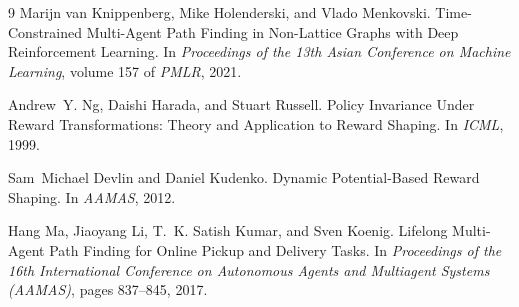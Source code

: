 \documentclass[11pt]{article}
\begin{document}
\begin{thebibliography}{9}
Marijn van Knippenberg, Mike Holenderski, and Vlado Menkovski.
\newblock Time-Constrained Multi-Agent Path Finding in Non-Lattice Graphs
  with Deep Reinforcement Learning.
\newblock In \emph{Proceedings of the 13th Asian Conference on Machine
  Learning}, volume 157 of \emph{PMLR}, 2021.

Andrew~Y. Ng, Daishi Harada, and Stuart Russell.
\newblock Policy Invariance Under Reward Transformations: Theory and
  Application to Reward Shaping.
\newblock In \emph{ICML}, 1999.

Sam~Michael Devlin and Daniel Kudenko.
\newblock Dynamic Potential-Based Reward Shaping.
\newblock In \emph{AAMAS}, 2012.

Hang Ma, Jiaoyang Li, T.~K. Satish Kumar, and Sven Koenig.
\newblock Lifelong Multi-Agent Path Finding for Online Pickup and Delivery
  Tasks.
\newblock In \emph{Proceedings of the 16th International Conference on
  Autonomous Agents and Multiagent Systems (AAMAS)}, pages 837--845, 2017.
\end{thebibliography}
\end{document}
